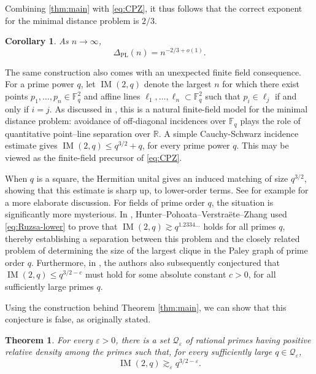 \documentclass[11pt,reqno]{amsart}
\newtheorem{theorem}{Theorem}[section]
\newtheorem{corollary}[corollary]{Corollary}
\theoremstyle{definition}
\theoremstyle{remark}
\newcommand{\eps}{\varepsilon}
\newcommand{\PL}{\Delta_{\mathrm{PL}}}
\begin{document}
Combining \cref{thm:main} with \eqref{eq:CPZ}, it thus follows that the correct exponent for the minimal distance problem is $2/3$. 

\begin{corollary}
\label{cor:sharp}
As $n\to\infty$,
\[
        \PL(n)=n^{-2/3+o(1)}.
\]
\end{corollary}

The same construction also comes with an unexpected finite field consequence. For a prime power $q$, let $\operatorname{IM}(2,q)$ denote the largest
$n$ for which there exist points
$p_1,\dots,p_n\in\mathbb F_q^2$ and affine lines
$\ell_1,\dots,\ell_n\subset\mathbb F_q^2$ such that $p_i\in\ell_j$ if and only if $i=j$. As discussed in \cite{CPZ2023,CPZ2025,HPVZ2026}, this is a natural finite-field model for the minimal distance problem: avoidance of off-diagonal incidences over $\mathbb F_q$ plays the role of quantitative point--line separation over $\mathbb R$. A simple Cauchy-Schwarz incidence estimate gives $\operatorname{IM}(2,q)\le q^{3/2}+q$, for every prime power $q$. This may be viewed as the finite-field
precursor of \eqref{eq:CPZ}.

When $q$ is a square, the Hermitian unital gives an induced matching of size $q^{3/2}$, showing that this estimate is sharp up, to lower-order terms. See for example \cite{HPVZ2026} for a more elaborate discussion. For fields of prime order $q$, the situation is significantly more mysterious. In \cite[Theorem~1.2]{HPVZ2026}, Hunter--Pohoata--Verstra\"ete--Zhang used \eqref{eq:Ruzsa-lower} to prove that $\operatorname{IM}(2,q)\gtrsim q^{1.2334\ldots}$ holds for all primes $q$, thereby establishing a separation between this problem and the closely related problem of determining the size of the largest clique in the Paley graph of prime order $q$. Furthermore, in \cite[Conjecture~10.2]{HPVZ2026}, the authors also subsequently conjectured that $\operatorname{IM}(2,q) \leq q^{3/2-c}$ must hold for some absolute constant $c > 0$, for all sufficiently large primes $q$. 

Using the construction behind Theorem \ref{thm:main}, we can show that this conjecture is false, as originally stated. 

\begin{theorem}
\label{thm:prime-field-matching}
For every $\eps>0$, there is a set $\mathcal Q_\eps$ of rational
primes having positive relative density among the primes such that,
for every sufficiently large $q\in\mathcal Q_\eps$,
$$\operatorname{IM}(2,q)
        \gtrsim_\eps q^{3/2-\eps}.$$
\end{theorem}
\end{document}
